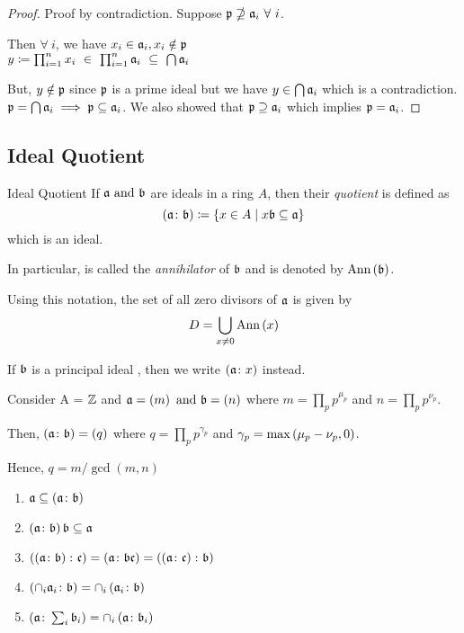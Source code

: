\begin{proof}
	Proof by contradiction.
	Suppose \( \mathfrak{p} \nsupseteq \mathfrak{a}_i \ \forall\ i \).

	Then \( \forall\ i \), we have
	\( x_i \in \mathfrak{a}_i, x_i \notin \mathfrak{p} \) \\
	\( y \coloneqq \prod_{i=1}^n x_i \ \in \ \prod_{i=1}^n \mfa_i
	\ \subseteq \ \bigcap \mfa_i \)

	But, \( y \notin \mathfrak{p} \) since \( \mathfrak{p} \) is a prime
	ideal but we have \( y \in \bigcap \mathfrak{a}_i \) which is a contradiction. \\

	\( \mathfrak{p} = \bigcap \mathfrak{a}_i \implies \mathfrak{p} \subseteq \mathfrak{a}_i \).
	We also showed that \( \mathfrak{p} \supseteq \mathfrak{a}_i \)
	which implies \( \mathfrak{p} = \mathfrak{a}_i \).
\end{proof}


\subsection{Ideal Quotient}

\begin{defn}{Ideal Quotient}{}
	If \( \mathfrak{a} \text{ and } \mathfrak{b} \) are ideals in a ring \( A \), then
	their \emph{quotient} is defined as
	\[
		\left( \mathfrak{a} \colon \mathfrak{b} \right) \coloneqq 
		\left\{ x \in A \mid x \mathfrak{b} \subseteq \mathfrak{a} \right\}
	\]
	which is an ideal.
\end{defn}

In particular, \brak{0 \colon \mfb} is called the \emph{annihilator}
of \( \mathfrak{b} \) and is denoted by \( \text{Ann}\left( \mathfrak{b} \right) \).

Using this notation, the set of all zero divisors of \( \mathfrak{a} \) is
given by
\[
	D = \bigcup_{x \neq 0} \text{Ann} \left( x \right)
\]

If \( \mathfrak{b} \) is a principal ideal , then we write
\( \left( \mathfrak{a} \colon x \right) \) instead.


\begin{example}{}{}
	Consider A = \( \ZZ \) and \( \mathfrak{a} = \left( m \right) \text{ and } \mathfrak{b} = \left( n \right) \)
	where \( m = \prod_p p^{\mu_p} \) and \( n = \prod_p p^{\nu_p} \).

	Then, \( \left( \mathfrak{a} \colon \mathfrak{b} \right) = \left( q \right) \) where
	\( q = \prod_p p^{\gamma_p} \) and
	\( \gamma_p = \max \left( \mu_p - \nu_p, 0 \right) \).

	Hence, \( q = m / \gcd(m, n) \)
\end{example}


\begin{proposition}{}{}
	\begin{enumerate}
		\item \( \mathfrak{a} \subseteq \left( \mathfrak{a} \colon \mathfrak{b} \right) \)
		\item \( \left( \mathfrak{a} \colon \mathfrak{b} \right) \mathfrak{b} \subseteq \mathfrak{a} \)
		\item \( \left( \left( \mathfrak{a} \colon \mathfrak{b} \right) \colon \mathfrak{c} \right) =
			\left( \mathfrak{a} \colon \mathfrak{b} \mathfrak{c} \right) =
			\left( \left( \mathfrak{a} \colon \mathfrak{c} \right) \colon \mathfrak{b} \right) \)
		\item \( \left( \cap_i \mathfrak{a}_i \colon \mathfrak{b} \right) =
			\cap_i \left( \mathfrak{a}_i \colon \mathfrak{b} \right) \)
		\item \( \left( \mathfrak{a} \colon \sum_i \mathfrak{b}_i \right) =
			\cap_i \left( \mathfrak{a} \colon \mathfrak{b}_i \right) \)
	\end{enumerate}
\end{proposition}

